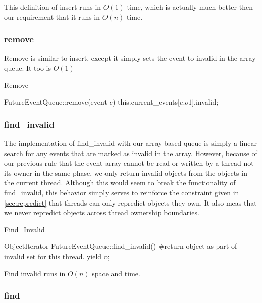 \documentclass[conference]{IEEEtran}
\begin{document}
This definition of insert runs in $O(1)$ time, which is actually much better then our requirement that it runs in $O(n)$ time.

\subsubsection{remove}

Remove is similar to insert, except it simply sets the event to invalid in the array queue.  It too is $O(1)$

\begin{algorithm}
\caption{Remove}
\begin{algorithmic}
\STATE FutureEventQueue::remove(event $e$)
\STATE this.current\_events[$e.o1$].invalid;
\end{algorithmic}
\end{algorithm}

\subsubsection{find\_invalid}

The implementation of find\_invalid with our array-based queue is simply a linear search for any events that are marked as invalid in the array.
However, because of our previous rule that the event array cannot be read or written by a thread not its owner in the same phase, we only return invalid
objects from the objects in the current thread.  Although this would seem to break the functionality of find\_invalid, this behavior simply serves to reinforce
the constraint given in \ref{sec:repredict} that threads can only repredict objects they own. It also meas that we never repredict objects across thread
ownership boundaries.
\begin{algorithm}
\caption{Find\_Invalid}
\begin{algorithmic}
\STATE ObjectIterator FutureEventQueue::find\_invalid()
		\STATE #return object as part of invalid set for this thread.
		\STATE yield o;
	\ENDIF
\ENDFOR
\end{algorithmic}
\end{algorithm}

Find invalid runs in $O(n)$ space and time.

\subsubsection{find}
\end{document}
